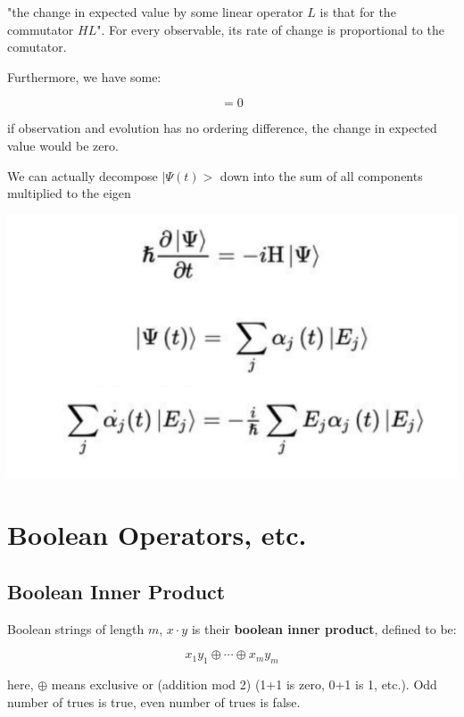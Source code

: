 \documentclass[letterpaper]{article}
\begin{document}
"the change in expected value by some linear operator \(L\) is that for the commutator \(HL\)". For every observable, its rate of change is proportional to the comutator.

Furthermore, we have some:

\begin{equation}
    [Q,H] = 0
\end{equation}

if observation and evolution has no ordering difference, the change in expected value would be zero.

We can actually decompose \(|\Psi(t)\big>\) down into the sum of all components multiplied to the eigen 

\begin{center}
\includegraphics[width=.9\linewidth]{2022-03-04_09-56-38_screenshot.png}
\end{center}


\section{Boolean Operators, etc.}
\label{sec:orgfe02e95}

\subsection{Boolean Inner Product}
\label{sec:org4886948}
Boolean strings of length \(m\), \(x \cdot y\) is their \textbf{\textbf{boolean inner product}}, defined to be:

\begin{equation}
x_1 y_1 \oplus \cdots \oplus x_my_m
\end{equation}

here, \(\oplus\) means exclusive or (addition mod 2) (1+1 is zero, 0+1 is 1, etc.). Odd number of trues is true, even number of trues is false.
\end{document}
